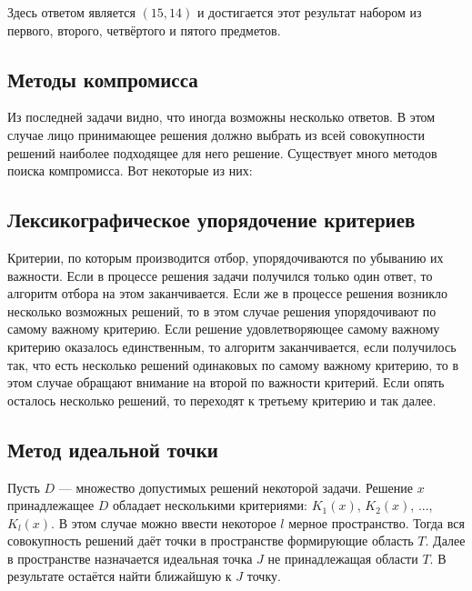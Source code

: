 Здесь ответом является $(15, 14)$ и достигается этот результат набором из первого, второго, четвёртого и пятого предметов.

\subsection*{Методы компромисса}

Из последней задачи видно, что иногда возможны несколько ответов. В этом случае лицо принимающее решения должно выбрать из всей совокупности решений наиболее подходящее для него решение. Существует много методов поиска компромисса. Вот некоторые из них:

\subsection*{Лексикографическое упорядочение критериев}

Критерии, по которым производится отбор, упорядочиваются по убыванию их важности. Если в процессе решения задачи получился только один ответ, то алгоритм отбора на этом заканчивается. Если же в процессе решения возникло несколько возможных решений, то в этом случае решения упорядочивают по самому важному критерию. Если решение удовлетворяющее самому важному критерию оказалось единственным, то алгоритм заканчивается, если получилось так, что есть несколько решений одинаковых по самому важному критерию, то в этом случае обращают внимание на второй по важности критерий. Если опять осталось несколько решений, то переходят к третьему критерию и так далее.

\subsection*{Метод идеальной точки}

Пусть $D$ --- множество допустимых решений некоторой задачи. Решение $x$ принадлежащее $D$ обладает несколькими критериями: $K_1(x)$, $K_2(x)$, ..., $K_l(x)$. В этом случае можно ввести некоторое $l$ мерное пространство. Тогда вся совокупность решений даёт точки в пространстве формирующие область $T$. Далее в пространстве назначается идеальная точка $J$ не принадлежащая области $T$. В результате остаётся найти ближайшую к $J$ точку.
